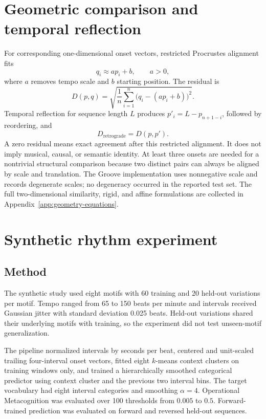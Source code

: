 \section{Geometric comparison and temporal reflection}
For corresponding one-dimensional onset vectors, restricted Procrustes alignment fits
\begin{equation}
q_i\approx ap_i+b,\qquad a>0,
\end{equation}
where $a$ removes tempo scale and $b$ starting position. The residual is
\begin{equation}
D(p,q)=\sqrt{\frac1n\sum_{i=1}^{n}\bigl(q_i-(ap_i+b)\bigr)^2}.
\label{eq:procrustes-1d}
\end{equation}
Temporal reflection for sequence length $L$ produces $p'_i=L-p_{n+1-i}$, followed by reordering, and
\begin{equation}
D_{\mathrm{retrograde}}=D(p,p').
\end{equation}
A zero residual means exact agreement after this restricted alignment. It does not imply musical, causal, or semantic identity. At least three onsets are needed for a nontrivial structural comparison because two distinct pairs can always be aligned by scale and translation. The Groove implementation uses nonnegative scale and records degenerate scales; no degeneracy occurred in the reported test set. The full two-dimensional similarity, rigid, and affine formulations are collected in Appendix~\ref{app:geometry-equations}.

\section{Synthetic rhythm experiment}
\subsection{Method}
The synthetic study used eight motifs with 60 training and 20 held-out variations per motif. Tempo ranged from 65 to 150 beats per minute and intervals received Gaussian jitter with standard deviation 0.025 beats. Held-out variations shared their underlying motifs with training, so the experiment did not test unseen-motif generalization.

The pipeline normalized intervals by seconds per beat, centered and unit-scaled trailing four-interval onset vectors, fitted eight $k$-means context clusters on training windows only, and trained a hierarchically smoothed categorical predictor using context cluster and the previous two interval bins. The target vocabulary had eight interval categories and smoothing $\alpha=4$. Operational Metacognition was evaluated over 100 thresholds from $0.005$ to $0.5$. Forward-trained prediction was evaluated on forward and reversed held-out sequences.

